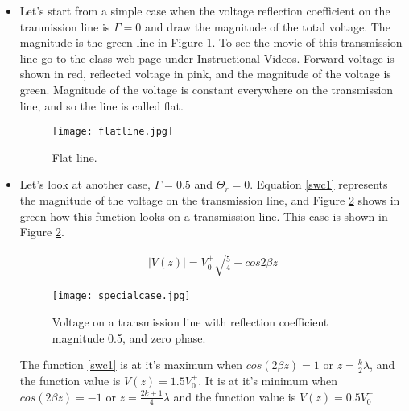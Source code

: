 \documentclass{ximera}
\begin{document}
\begin{itemize}
 \item Let's start 
from a simple case when the voltage reflection coefficient on the
tranmission line is $\Gamma=0$ and draw the magnitude of the total
voltage. The magnitude is the green line in Figure \ref{flatline}. To see the movie
of this transmission line go to the class web page under Instructional Videos. Forward voltage is shown in red, reflected voltage in pink,
and the magnitude of the voltage is  green. Magnitude of the voltage is constant everywhere on the transmission line, and so the line
is called flat.




\begin{figure}[htbp]
\begin{center}
\texttt{[image: flatline.jpg]}
\end{center}
\caption{Flat line.}
\label{flatline}
\end{figure}



\item Let's look at another case,  $\Gamma=0.5$ and $\Theta_r=0$. Equation \ref{swc1}  represents the magnitude of the voltage on the transmission line, and Figure \ref{reflcoeffvid} shows in green how this function looks on a transmission line. This case is shown in Figure \ref{reflcoeffvid}. 

\begin{eqnarray}
|V(z)|=V_0^+ \sqrt{\frac{5}{4}+ cos{2 \beta z} }\label{swc1}
\end{eqnarray}

\begin{figure}[htbp]
\begin{center}
\texttt{[image: specialcase.jpg]}
\end{center}
\caption{Voltage on a transmission line with reflection coefficient magnitude 0.5, and zero phase.}
\label{reflcoeffvid}
\end{figure}



The function \ref{swc1} is at it's maximum 
when $cos(2 \beta z)=1$ or $z=\frac{k}{2} \lambda$, and the function
value is $V(z)=1.5V_0^+  $. It is at it's
minimum when  $cos(2 \beta z)=-1$ or $z=\frac{2 k +1}{4} \lambda$
and the function value is $V(z)=0.5 V_0^+$


\end{itemize}
\end{document}
